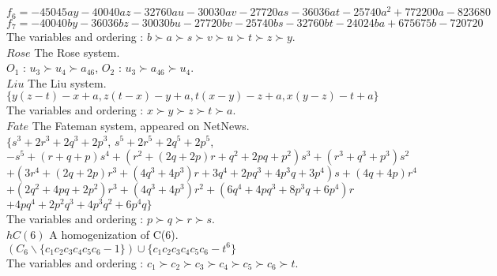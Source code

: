 {{\begin{tabbing}
	\> {\scriptsize $f_6=-45045ay-40040az-32760au-30030av-27720as-36036at-25740a^2+772200a-823680$}\\
	\> {\scriptsize $f_7=-40040by-36036bz-30030bu-27720bv-25740bs-32760bt-24024ba+675675b-720720$}\\
	\normalsize
	  \> The variables and ordering : $b \succ a \succ s \succ v \succ u \succ t \succ z \succ y$.\\
$Rose$ \> The Rose system.\\
    \> $O_1$ : $u_3 \succ u_4 \succ a_{46}$, $O_2$ : $u_3 \succ a_{46} \succ u_4$.\\
$Liu$ \> The Liu system.\\
      \> $\{y(z-t)-x+a, z(t-x)-y+a, t(x-y)-z+a, x(y-z)-t+a\}$\\
      \> The variables and ordering : $x \succ y \succ z \succ t \succ a$.\\
$Fate$ \> The Fateman system, appeared on NetNews. \\
       \> $\{s^3+2r^3+2q^3+2p^3$, $s^5+2r^5+2q^5+2p^5$,\\
       \> $-s^5+(r+q+p)s^4+(r^2+(2q+2p)r+q^2+2pq+p^2)s^3+(r^3+q^3+p^3)s^2$\\
       \> $+(3r^4+(2q+2p)r^3+(4q^3+4p^3)r+3q^4+2pq^3+4p^3q+3p^4)s+(4q+4p)r^4$\\
       \> $+(2q^2+4pq+2p^2)r^3+(4q^3+4p^3)r^2+(6q^4+4pq^3+8p^3q+6p^4)r$\\
	   \> $+4pq^4+2p^2q^3+4p^3q^2+6p^4q\}$\\
       \> The variables and ordering : $p \succ q \succ r \succ s$.\\
$hC(6)$ \> A homogenization of C(6). \\
       \> $(C_6\backslash \{c_1c_2c_3c_4c_5c_6-1\})\cup \{c_1c_2c_3c_4c_5c_6-t^6\}$\\
       \> The variables and ordering : 
	   $c_1 \succ c_2 \succ c_3 \succ c_4 \succ c_5 \succ c_6 \succ t$.\\
\end{tabbing}


}}
